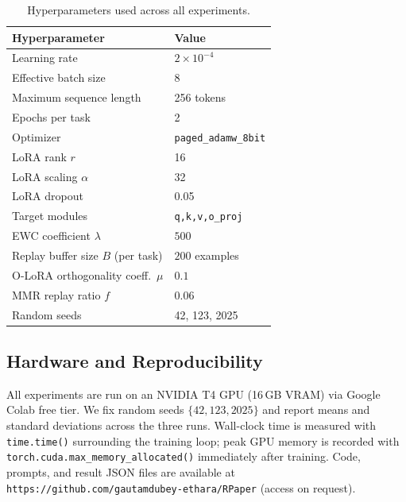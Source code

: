 \begin{table}[h]
\centering
\caption{Hyperparameters used across all experiments.}
\label{tab:hparams}
\begin{tabular}{ll}
\toprule
\textbf{Hyperparameter}               & \textbf{Value}                \\
\midrule
Learning rate                         & $2 \times 10^{-4}$            \\
Effective batch size                  & 8                             \\
Maximum sequence length               & 256 tokens                    \\
Epochs per task                       & 2                             \\
Optimizer                             & \texttt{paged\_adamw\_8bit}   \\
LoRA rank $r$                         & 16                            \\
LoRA scaling $\alpha$                 & 32                            \\
LoRA dropout                          & 0.05                          \\
Target modules                        & \texttt{q,k,v,o\_proj}        \\
EWC coefficient $\lambda$             & $500$                         \\
Replay buffer size $B$ (per task)     & $200$ examples                \\
O-LoRA orthogonality coeff.\ $\mu$    & $0.1$                         \\
MMR replay ratio $f$                  & $0.06$                        \\
Random seeds                          & 42, 123, 2025                 \\
\bottomrule
\end{tabular}
\end{table}

\subsection{Hardware and Reproducibility}

All experiments are run on an NVIDIA T4 GPU (16\,GB VRAM) via Google Colab free tier.
We fix random seeds $\{42, 123, 2025\}$ and report means and standard deviations across the three
runs.
Wall-clock time is measured with \texttt{time.time()} surrounding the training loop; peak GPU
memory is recorded with \texttt{torch.cuda.max\_memory\_allocated()} immediately after training.
Code, prompts, and result JSON files are available at \texttt{https://github.com/gautamdubey-ethara/RPaper} (access on request).
